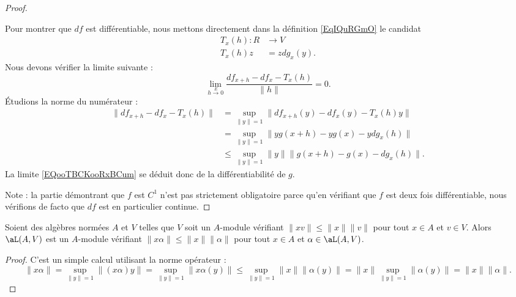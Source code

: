 \begin{proof}
\begin{subproof}
            Pour montrer que \( df\) est différentiable, nous mettons directement dans la définition \eqref{EqIQuRGmO} le candidat
            \begin{equation}
                \begin{aligned}
                    T_x(h)\colon R&\to V \\
                    T_x(h)z&=zdg_x(y).
                \end{aligned}
            \end{equation}
            Nous devons vérifier la limite suivante :
            \begin{equation}        \label{EQooTBCKooRxBCum}
                \lim_{h\stackrel{E}{\longrightarrow} 0} \frac{ df_{x+h}-df_x-T_x(h) }{ \| h \| }=0.
            \end{equation}
            Étudions la norme du numérateur :
            \begin{subequations}
                \begin{align}
                    \| df_{x+h}-df_x-T_x(h) \|&=\sup_{\| y \|=1}\| df_{x+h}(y)-df_x(y)-T_x(h)y \|\\
                    &=\sup_{\| y \|=1}\| yg(x+h)-yg(x)-ydg_x(h) \|\\
                    &\leq \sup_{\| y \|=1}\| y \| \| g(x+h)-g(x)-dg_x(h) \|.
                \end{align}
            \end{subequations}
            La limite \eqref{EQooTBCKooRxBCum} se déduit donc de la différentiabilité de \( g\).
    \end{subproof}
    Note : la partie démontrant que \( f\) est \( C^1\) n'est pas strictement obligatoire parce qu'en vérifiant que \( f\) est deux fois différentiable, nous vérifions de facto que \( df\) est en particulier continue.
\end{proof}

\begin{lemma}   \label{LEMooTUWQooMCCDcm}
    Soient des algèbres normées \( A\) et \( V\) telles que \( V\) soit un \( A\)-module vérifiant \( \| xv \|\leq \| x \|\| v \|\) pour tout \( x\in A\) et \( v\in V\). Alors \( \aL(A,V)\) est un \( A\)-module vérifiant \( \| x\alpha \|\leq \| x \|\|\alpha  \|\) pour tout \( x\in A\) et \( \alpha\in \aL(A,V)\).
\end{lemma}

\begin{proof}
    C'est un simple calcul utilisant la norme opérateur :
    \begin{equation}
            \| x\alpha \|=\sup_{\| y \|=1}\| (x\alpha)y \|
            =\sup_{\| y \|=1}\| x\alpha(y) \|
            \leq \sup_{\| y \|=1}\| x \|\| \alpha(y) \|
            =\| x \|\sup_{\| y \|=1}\| \alpha(y) \|
            =\| x \|\| \alpha \|.
    \end{equation}
\end{proof}

